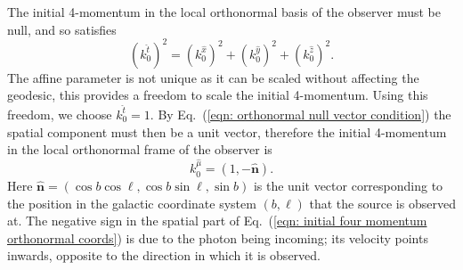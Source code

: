 \documentclass[a4paper,12pt]{report}
\newcommand{\uvec}[1]{\hat{\bm{#1}}}
\renewcommand{\eqref}[1]{Eq.~({#1})}
\begin{document}
The initial 4-momentum in the local orthonormal basis of the observer must be null, and so satisfies
\begin{equation}\label{eqn: orthonormal null vector condition}
    (k^{\hat{t}}_0)^2 = (k^{\hat{x}}_0)^2 + (k^{\hat{y}}_0)^2 + (k^{\hat{z}}_0)^2.
\end{equation}
The affine parameter is not unique as it can be scaled without affecting the geodesic, this provides a freedom to scale the initial 4-momentum. Using this freedom, we choose $k^{\hat{t}}_0 = 1$. By \eqref{\ref{eqn: orthonormal null vector condition}} the spatial component must then be a unit vector, therefore the initial 4-momentum in the local orthonormal frame of the observer is
\begin{equation}\label{eqn: initial four momentum orthonormal coords}
  k^{\hat{\mu}}_0 = (1, -\uvec{n}).
\end{equation}
Here $\uvec{n} = (\cos b\cos \ell, \cos b\sin \ell, \sin b)$ is the unit vector corresponding to the position in the galactic coordinate system $(b, \ell)$ that the source is observed at.
The negative sign in the spatial part of \eqref{\ref{eqn: initial four momentum orthonormal coords}} is due to the photon being incoming; its velocity points inwards, opposite to the direction in which it is observed.
\end{document}

